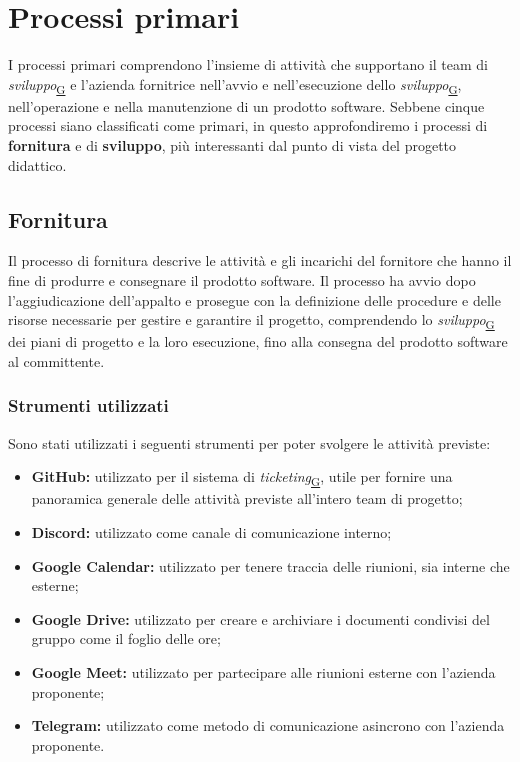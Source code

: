 \documentclass[a4paper,12pt]{article}
\begin{document}
\newpage

\section{Processi primari}{
    I processi primari comprendono l'insieme di attività che supportano il team di \textit{sviluppo}\textsubscript{\href{https://atlasteam9.github.io/Atlas/glossario.html\#Sviluppo}{G}} e l'azienda fornitrice nell'avvio e nell'esecuzione dello \textit{sviluppo}\textsubscript{\href{https://atlasteam9.github.io/Atlas/glossario.html\#Sviluppo}{G}}, nell'operazione e nella manutenzione di un prodotto software.
    \newline
    Sebbene cinque processi siano classificati come primari, in questo approfondiremo i processi di \textbf{fornitura} e di \textbf{sviluppo}, più interessanti dal punto di vista del progetto didattico.
    
    \subsection{Fornitura}{
        Il processo di fornitura descrive le attività e gli incarichi del fornitore che hanno il fine di produrre e consegnare il prodotto software. Il processo ha avvio dopo l'aggiudicazione dell'appalto e prosegue con la definizione delle procedure e delle risorse necessarie per gestire e garantire il progetto, comprendendo lo \textit{sviluppo}\textsubscript{\href{https://atlasteam9.github.io/Atlas/glossario.html\#Sviluppo}{G}} dei piani di progetto e la loro esecuzione, fino alla consegna del prodotto software al committente.

        \subsubsection{Strumenti utilizzati}{
            Sono stati utilizzati i seguenti strumenti per poter svolgere le attività previste:
            \begin{itemize}
                \item \textbf{GitHub:} utilizzato per il sistema di \textit{ticketing}\textsubscript{\href{https://atlasteam9.github.io/Atlas/glossario.html\#Ticketing}{G}}, utile per fornire una panoramica generale delle attività previste all'intero team di progetto;
                \item \textbf{Discord:} utilizzato come canale di comunicazione interno;
                \item \textbf{Google Calendar:} utilizzato per tenere traccia delle riunioni, sia interne che esterne;
                \item \textbf{Google Drive:} utilizzato per creare e archiviare i documenti condivisi del gruppo come il foglio delle ore;
                \item \textbf{Google Meet:} utilizzato per partecipare alle riunioni esterne con l'azienda proponente;
                \item \textbf{Telegram:} utilizzato come metodo di comunicazione asincrono con l'azienda proponente.
            \end{itemize}
        }
        

}}
\end{document}
